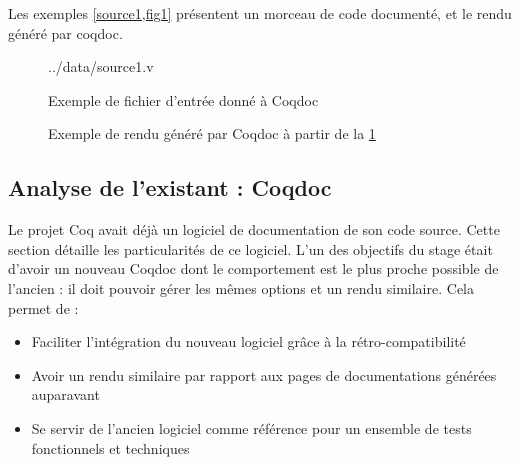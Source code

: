 \documentclass[a4paper, 11pt]{report}
\begin{document}
    Les exemples \cref{source1,fig1} présentent un morceau de code documenté, et le rendu
    généré par coqdoc.
    \begin{figure}
      
        {../data/source1.v}
        \caption{Exemple de fichier d'entrée donné à Coqdoc\label{source1}}
    \end{figure}

    \begin{figure}

      \caption{Exemple de rendu généré par Coqdoc à partir de la \cref{source1}}
      \label{fig1}
    \end{figure}

    \clearpage

    \subsection{Analyse de l'existant : Coqdoc}
    Le projet Coq avait déjà un logiciel de documentation de son code source.
    Cette section détaille les particularités de ce logiciel. L'un des objectifs
    du stage était d'avoir un nouveau Coqdoc dont le comportement est le plus
    proche possible de l'ancien : il doit pouvoir gérer les mêmes options et
    un rendu similaire. Cela permet de :
    \begin{itemize}
      \item Faciliter l'intégration du nouveau logiciel grâce à la
        rétro-compatibilité
      \item Avoir un rendu similaire par rapport aux pages de documentations
        générées auparavant
      \item Se servir de l'ancien logiciel comme référence pour un ensemble
        de tests fonctionnels et techniques
    \end{itemize}
\end{document}
